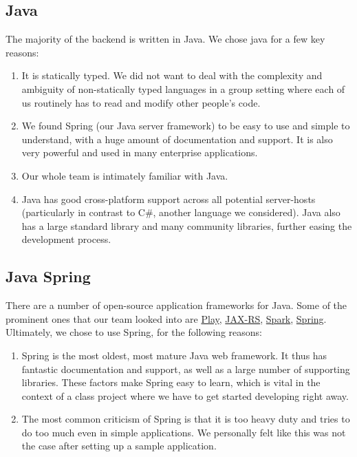 \documentclass[12pt]{article}
\begin{document}
\subsection{Java}
The majority of the backend is written in Java. We chose java for a few key reasons:
\begin{enumerate}
    \item It is statically typed. We did not want to deal with the complexity and ambiguity of non-statically typed languages in a group setting where each of us routinely has to read and modify other people’s code. 
    \item We found Spring (our Java server framework) to be easy to use and simple to understand, with a huge amount of documentation and support. It is also very powerful and used in many enterprise applications. 
    \item Our whole team is intimately familiar with Java. 
    \item Java has good cross-platform support across all potential server-hosts (particularly in contrast to C\#, another language we considered). Java also has a large standard library and many community libraries, further easing the development process. 
\end{enumerate}

\subsection{Java Spring}
There are a number of open-source application frameworks for Java. Some of the prominent ones that our team looked into are \href{https://www.playframework.com/}{Play}, \href{https://jax-rs-spec.java.net/}{JAX-RS}, \href{http://sparkjava.com}{Spark}, \href{https://spring.io/}{Spring}. Ultimately, we chose to use Spring, for the following reasons:
\begin{enumerate}
    \item Spring is the most oldest, most mature Java web framework. It thus has fantastic documentation and support, as well as a large number of supporting libraries.  These factors make Spring easy to learn, which is vital in the context of a class project where we have to get started developing right away. 
    \item The most common criticism of Spring is that it is too heavy duty and tries to do too much even in simple applications. We personally felt like this was not the case after setting up a sample application.
\end{enumerate}
\end{document}
